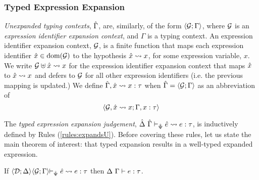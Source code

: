 \subsubsection{Typed Expression Expansion}
\emph{Unexpanded typing contexts}, $\hat{\Gamma}$, are, similarly, of the form $\langle \mathcal{G}; \Gamma \rangle$, where $\mathcal{G}$ is an \emph{expression identifier expansion context}, and $\Gamma$ is a typing context. An expression identifier expansion context, $\mathcal{G}$, is a finite function that maps each expression identifier ${\hat x} \in \text{dom}(\mathcal{G})$ to the hypothesis ${\hat x} \leadsto x$, for some expression variable, $x$. We write $\mathcal{G} \uplus {\hat x} \leadsto x$ for the expression identifier expansion context that maps ${\hat x}$ to ${\hat x} \leadsto x$ and defers to $\mathcal{G}$ for all other expression identifiers (i.e. the previous mapping is updated.) %
We define $\hat{\Gamma}, {\hat x} \leadsto x : \tau$ when $\hat{\Gamma} = \langle \mathcal{G}; \Gamma \rangle$ as an abbreviation of \[\langle \mathcal{G}, {\hat x} \leadsto x; \Gamma, x : \tau \rangle\]

The \emph{typed expression expansion judgement}, $\hat{\Delta}~\hat{\Gamma} \vdash_{\hat{\Psi}} {\hat e} \leadsto e : \tau$, is inductively defined by Rules (\ref{rules:expandsU}). Before covering these rules, let us state the main theorem of interest: that typed expansion results in a well-typed expanded expression.
\begingroup
\def\thetheorem{\ref{thm:typed-expansion-short-U}}
\begin{theorem} \hspace{-3px}If $\expandsU{\uDD{\uD}{\Delta}\hspace{-3px}}{\uGG{\uG}{\Gamma}\hspace{-3px}}{\uPsi}{\ue}{e}{\tau}$ then $\Delta~\Gamma \vdash e : \tau$.
\end{theorem}
\endgroup

